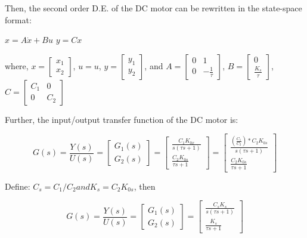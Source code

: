 \documentclass[11pt,a4paper]{article}
\begin{document}
Then, the second order D.E. of the DC motor can be rewritten in the state-space format:

$x = A\dot{x} + Bu$
$y = Cx$

where, $x = \left[\begin{matrix}x_{1} \\ x_{2}\end{matrix}\right]$, $u=u$, $y = \left[\begin{matrix}y_{1} \\ y_{2}\end{matrix}\right]$, and
$A = \left[\begin{matrix}0 & 1 \\ 0 & -\frac{1}{\tau}\end{matrix}\right]$, $B=\left[\begin{matrix} 0 \\ \frac{K_{s}}{\tau} \end{matrix}\right]$, $C = \left[\begin{matrix}C_{1} & 0 \\ 0 & C_{2} \end{matrix}\right]$

Further, the input/output transfer function of the DC motor is:

\begin{equation} \label{eq:11}
G(s)=\frac{Y(s)}{U(s)} = \left[ \begin{matrix} G_{1}(s) \\ G_{2}(s) \end{matrix} \right] = \left[ \begin{matrix} \frac{C_{1}K_{0x}}{s(\tau s + 1)} \\ \frac{C_{2}K_{0s}}{\tau s + 1} \end{matrix} \right] = \left[ \begin{matrix} \frac{\left(\frac{C_{1}}{C_{2}}\right)*C_{2}K_{0s}}{s(\tau s + 1)} \\ \frac{C_{2}K_{0s}}{\tau s + 1} \end{matrix} \right]
\end{equation}

Define: $C_{s}=C_{1}/C_{2} and K_{s}=C_{2}K_{0s}$, then

\begin{equation} \label{eq:12}
G(s)=\frac{Y(s)}{U(s)} = \left[ \begin{matrix} G_{1}(s) \\ G_{2}(s) \end{matrix} \right] = \left[ \begin{matrix} \frac{C_{s}K_{s}}{s(\tau s + 1)} \\ \frac{K_{s}}{\tau s + 1} \end{matrix} \right]
\end{equation}
\end{document}
